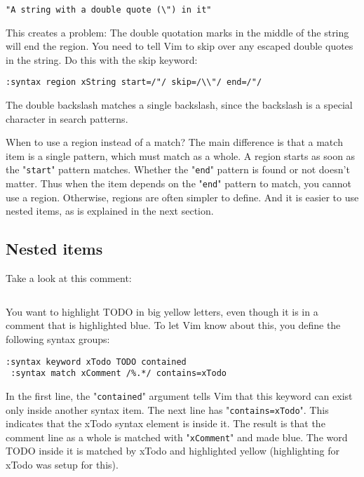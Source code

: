 \begin{Verbatim}[samepage=true]
    "A string with a double quote (\") in it" 
\end{Verbatim}

This creates a problem: The double quotation marks in the middle of the string will end the region.
You need to tell Vim to skip over any escaped double quotes in the string.
Do this with the skip keyword:

\begin{Verbatim}[samepage=true]
 :syntax region xString start=/"/ skip=/\\"/ end=/"/
\end{Verbatim}

The double backslash matches a single backslash, since the backslash is a special character in search patterns.

When to use a region instead of a match?
The main difference is that a match item is a single pattern, which must match as a whole.
A region starts as soon as the "\texttt{start}" pattern matches.
Whether the "\texttt{end}" pattern is found or not doesn't matter.
Thus when the item depends on the "\texttt{end}" pattern to match, you cannot use a region.
Otherwise, regions are often simpler to define.
And it is easier to use nested items, as is explained in the next section.
\subsection{Nested items}
Take a look at this comment:

\begin{Verbatim}[samepage=true]
    %Get input  TODO: Skip white space 
\end{Verbatim}

You want to highlight TODO in big yellow letters, even though it is in a comment that is highlighted blue.
To let Vim know about this, you define the following syntax groups:

\begin{Verbatim}[samepage=true]
 :syntax keyword xTodo TODO contained
 :syntax match xComment /%.*/ contains=xTodo
\end{Verbatim}

In the first line, the "\texttt{contained}" argument tells Vim that this keyword can exist only inside another syntax item.
The next line has "\texttt{contains=xTodo}".
This indicates that the xTodo syntax element is inside it.
The result is that the comment line as a whole is matched with "\texttt{xComment}" and made blue.
The word TODO inside it is matched by xTodo and highlighted yellow (highlighting for xTodo was setup for this).

